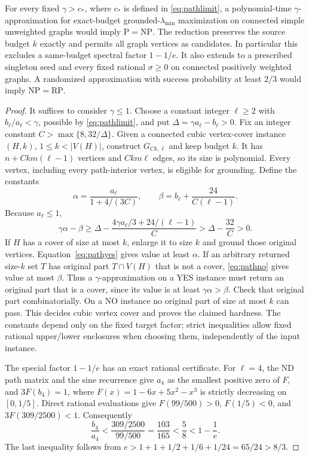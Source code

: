 \begin{theorem}
\label{thm:amplifiedhardness}
For every fixed $\gamma>c_*$, where $c_*$ is defined in
\eqref{eq:pathlimit}, a polynomial-time $\gamma$-approximation
for exact-budget grounded-$\lambda_{\min}$ maximization on connected
simple unweighted graphs would imply $\mathrm P=\mathrm{NP}$.
The reduction preserves the source budget $k$ exactly and permits
all graph vertices as candidates. In particular this excludes a
same-budget spectral factor $1-1/e$. It also extends to a prescribed
singleton seed and every fixed rational $\sigma\geq0$ on connected
positively weighted graphs. A randomized approximation with success
probability at least $2/3$ would imply $\mathrm{NP}=\mathrm{RP}$.
\end{theorem}
\begin{proof}
It suffices to consider $\gamma\leq1$. Choose a constant integer
$\ell\geq2$ with $b_\ell/a_\ell<\gamma$, possible by
\eqref{eq:pathlimit}, and put $\Delta=\gamma a_\ell-b_\ell>0$.
Fix an integer constant $C>\max\{8,32/\Delta\}$.
Given a connected cubic vertex-cover instance $(H,k)$,
$1\leq k<|V(H)|$, construct $G_{Ck,\ell}$ and keep budget $k$.
It has $n+Ckm(\ell-1)$ vertices and $Ckm\ell$ edges, so its size
is polynomial. Every vertex, including every path-interior vertex,
is eligible for grounding. Define the constants
\[
 \alpha=\frac{a_\ell}{1+4/(3C)},\qquad
 \beta=b_\ell+\frac{24}{C(\ell-1)}.
\]
Because $a_\ell\leq1$,
\[
 \gamma\alpha-\beta
 \geq\Delta-\frac{4\gamma a_\ell/3+24/(\ell-1)}C
 >\Delta-\frac{32}C>0.
\]
If $H$ has a cover of size at most $k$, enlarge it to size $k$
and ground those original vertices. Equation~\eqref{eq:pathyes}
gives value at least $\alpha$. If an arbitrary returned size-$k$
set $T$ has original part $T\cap V(H)$ that is not a cover,
\eqref{eq:pathno} gives value at most $\beta$.
Thus a $\gamma$-approximation on a YES instance must return an
original part that is a cover, since its value is at least
$\gamma\alpha>\beta$. Check that original part combinatorially.
On a NO instance no original part of size at most $k$ can pass.
This decides cubic vertex cover and proves the claimed hardness.
The constants depend only on the fixed target factor; strict
inequalities allow fixed rational upper/lower enclosures when
choosing them, independently of the input instance.

The special factor $1-1/e$ has an exact rational certificate.
For $\ell=4$, the ND path matrix and the sine recurrence give
$a_4$ as the smallest positive zero of $F$, and $3F(b_4)=1$, where
$F(x)=1-6x+5x^2-x^3$ is strictly decreasing on $[0,1/5]$.
Direct rational evaluations give
$F(99/500)>0$, $F(1/5)<0$, and $3F(309/2500)<1$.
Consequently
\[
 \frac{b_4}{a_4}<\frac{309/2500}{99/500}
 =\frac{103}{165}<\frac58<1-\frac1e.
\]
The last inequality follows from
$e>1+1+1/2+1/6+1/24=65/24>8/3$.


\end{proof}
